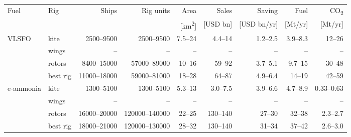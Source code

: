 \begin{tabular}{@{}llrrrrrrr@{}}
\toprule
Fuel & Rig & Ships & Rig units & Area & Sales & Saving & Fuel & CO\textsubscript{2} \\
 & &  &  & [km\textsuperscript{2}] & [USD bn] & [USD bn/yr] & [Mt/yr] & [Mt/yr] \\
\midrule
VLSFO & kite & \num{2500}--\num{9500} & \num{2500}--\num{9500} & \num{7.5}--\num{24} & \num{4.4}--\num{14} & \num{1.2}--\num{2.5} & \num{3.9}--\num{8.3} & \num{12}--\num{26} \\
 & wings & -- & -- & -- & -- & -- & -- & -- \\
 & rotors & \num{8400}--\num{15000} & \num{57000}--\num{89000} & \num{10}--\num{16} & \num{59}--\num{92} & \num{3.7}--\num{5.1} & \num{9.7}--\num{15} & \num{30}--\num{48} \\
 & best rig & \num{11000}--\num{18000} & \num{59000}--\num{81000} & \num{18}--\num{28} & \num{64}--\num{87} & \num{4.9}--\num{6.4} & \num{14}--\num{19} & \num{42}--\num{59} \\
\midrule
e-ammonia & kite & \num{1300}--\num{5100} & \num{1300}--\num{5100} & \num{5.3}--\num{13} & \num{3.0}--\num{7.5} & \num{3.9}--\num{6.6} & \num{4.7}--\num{8.9} & \num{0.33}--\num{0.63} \\
 & wings & -- & -- & -- & -- & -- & -- & -- \\
 & rotors & \num{16000}--\num{20000} & \num{120000}--\num{140000} & \num{22}--\num{25} & \num{130}--\num{140} & \num{27}--\num{30} & \num{32}--\num{38} & \num{2.3}--\num{2.7} \\
 & best rig & \num{18000}--\num{21000} & \num{120000}--\num{130000} & \num{28}--\num{32} & \num{130}--\num{140} & \num{31}--\num{34} & \num{37}--\num{42} & \num{2.6}--\num{3.0} \\
\bottomrule
\end{tabular}
